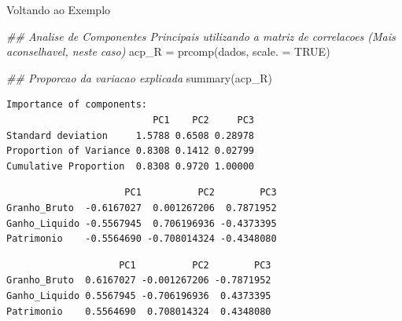 \documentclass[
  ignorenonframetext,
  aspectratio=169,
]{beamer}
\newenvironment{Shaded}{\begin{snugshade}}{\end{snugshade}}
\newcommand{\AttributeTok}[1]{\textcolor[rgb]{0.40,0.45,0.13}{#1}}
\newcommand{\ConstantTok}[1]{\textcolor[rgb]{0.56,0.35,0.01}{#1}}
\newcommand{\DocumentationTok}[1]{\textcolor[rgb]{0.37,0.37,0.37}{\textit{#1}}}
\newcommand{\FunctionTok}[1]{\textcolor[rgb]{0.28,0.35,0.67}{#1}}
\newcommand{\NormalTok}[1]{\textcolor[rgb]{0.00,0.23,0.31}{#1}}
\newcommand{\OtherTok}[1]{\textcolor[rgb]{0.00,0.23,0.31}{#1}}
\newcommand{\SpecialCharTok}[1]{\textcolor[rgb]{0.37,0.37,0.37}{#1}}
\begin{document}
\begin{frame}[fragile]{Voltando ao Exemplo}
\label{voltando-ao-exemplo-4}
\begin{Shaded}
\begin{Highlighting}[]
\DocumentationTok{\#\# Analise de Componentes Principais utilizando a matriz de correlacoes (Mais aconselhavel, neste caso)}
\NormalTok{acp\_R }\OtherTok{=} \FunctionTok{prcomp}\NormalTok{(dados, }\AttributeTok{scale. =} \ConstantTok{TRUE}\NormalTok{)}

\DocumentationTok{\#\# Proporcao da variacao explicada}
\FunctionTok{summary}\NormalTok{(acp\_R)}
\end{Highlighting}
\end{Shaded}

\begin{verbatim}
Importance of components:
                          PC1    PC2     PC3
Standard deviation     1.5788 0.6508 0.28978
Proportion of Variance 0.8308 0.1412 0.02799
Cumulative Proportion  0.8308 0.9720 1.00000
\end{verbatim}

\begin{Shaded}
\end{Shaded}

\begin{verbatim}
                     PC1          PC2        PC3
Granho_Bruto  -0.6167027  0.001267206  0.7871952
Ganho_Liquido -0.5567945  0.706196936 -0.4373395
Patrimonio    -0.5564690 -0.708014324 -0.4348080
\end{verbatim}

\begin{Shaded}
\end{Shaded}

\begin{verbatim}
                    PC1          PC2        PC3
Granho_Bruto  0.6167027 -0.001267206 -0.7871952
Ganho_Liquido 0.5567945 -0.706196936  0.4373395
Patrimonio    0.5564690  0.708014324  0.4348080
\end{verbatim}
\end{frame}
\end{document}

